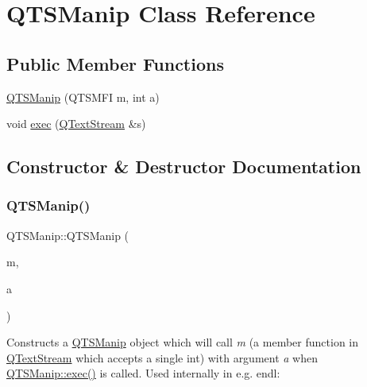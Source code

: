 \hypertarget{class_q_t_s_manip}{}\section{Q\+T\+S\+Manip Class Reference}
\label{class_q_t_s_manip}
\subsection*{Public Member Functions}
\begin{DoxyCompactItemize}
\item 
\mbox{\hyperlink{class_q_t_s_manip_a35cc537423248be4cbc121985fc13e43}{Q\+T\+S\+Manip}} (Q\+T\+S\+M\+FI m, int a)
\item 
void \mbox{\hyperlink{class_q_t_s_manip_ab314976728bf3e96ea881ba137d3ff37}{exec}} (\mbox{\hyperlink{class_q_text_stream}{Q\+Text\+Stream}} \&s)
\end{DoxyCompactItemize}


\subsection{Constructor \& Destructor Documentation}
\mbox{\label{class_q_t_s_manip_a35cc537423248be4cbc121985fc13e43}} 
\subsubsection{\texorpdfstring{QTSManip()}{QTSManip()}}
{\footnotesize\ttfamily Q\+T\+S\+Manip\+::\+Q\+T\+S\+Manip (\begin{DoxyParamCaption}\item[{Q\+T\+S\+M\+FI}]{m,  }\item[{int}]{a }\end{DoxyParamCaption})\hspace{0.3cm}{\ttfamily [inline]}}

Constructs a \mbox{\hyperlink{class_q_t_s_manip}{Q\+T\+S\+Manip}} object which will call {\itshape m} (a member function in \mbox{\hyperlink{class_q_text_stream}{Q\+Text\+Stream}} which accepts a single int) with argument {\itshape a} when \mbox{\hyperlink{class_q_t_s_manip_ab314976728bf3e96ea881ba137d3ff37}{Q\+T\+S\+Manip\+::exec()}} is called. Used internally in e.\+g. endl\+:


\begin{DoxyCode}{0}
\end{DoxyCode}
 

